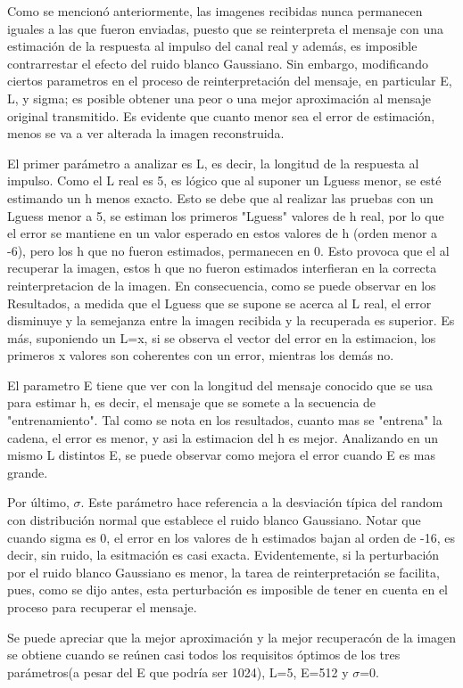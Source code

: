 \documentclass{article}
\begin{document}
\begin{multicols}{2}
\par Como se mencionó anteriormente, las imagenes recibidas nunca permanecen iguales a las que fueron enviadas, puesto que se reinterpreta el mensaje con una estimación de la respuesta al impulso del canal real y además, es imposible contrarrestar el efecto del ruido blanco Gaussiano. Sin embargo, modificando ciertos parametros en el proceso de reinterpretación del mensaje, en particular E, L, y sigma; es posible obtener una peor o una mejor aproximación al mensaje original transmitido. Es evidente que cuanto menor sea el error de estimación, menos se va a ver alterada la imagen reconstruida. 
\par El primer parámetro a analizar es L, es decir, la longitud de la respuesta al impulso. Como el L real es 5, es lógico que al suponer un Lguess menor, se esté estimando un h menos exacto. Esto se debe que al realizar las pruebas con un Lguess menor a 5, se estiman los primeros "Lguess" valores de h real, por lo que el error se mantiene en un valor esperado en estos valores de h (orden menor a -6), pero los h que no fueron estimados, permanecen en 0. Esto provoca que el al recuperar la imagen, estos h que no fueron estimados interfieran en la correcta reinterpretacion de la imagen. En consecuencia, como se puede observar en los Resultados, a medida que el Lguess que se supone se acerca al L real, el error disminuye y la semejanza entre la imagen recibida y la recuperada es superior. Es más, suponiendo un L=x, si se observa el vector del error en la estimacion, los primeros x valores son coherentes con un error, mientras los demás  no.
\par El parametro E tiene que ver con la longitud del mensaje conocido que se usa para estimar h, es decir, el mensaje que se somete a la secuencia de "entrenamiento". Tal como se nota en los resultados, cuanto mas se "entrena" la cadena, el error es menor, y asi la estimacion del h es mejor. Analizando en un mismo L distintos E, se puede observar como mejora el error cuando E es mas grande.
\par Por último, $\sigma$. Este parámetro hace referencia a la desviación típica del random con distribución normal que establece el ruido blanco Gaussiano. Notar que cuando sigma es 0, el error en los valores de h estimados bajan al orden de -16, es decir, sin ruido, la esitmación es casi exacta.  Evidentemente, si la perturbación por el ruido blanco Gaussiano es menor, la tarea de reinterpretación se facilita, pues, como se dijo antes, esta perturbación es imposible de tener en cuenta en el proceso para recuperar el mensaje.
\par Se puede apreciar que la mejor aproximación y la mejor recuperacón de la imagen se obtiene cuando se reúnen casi todos los requisitos óptimos de los tres parámetros(a pesar del E que podría ser 1024), L=5, E=512 y $\sigma$=0.



\end{multicols}
\end{document}
